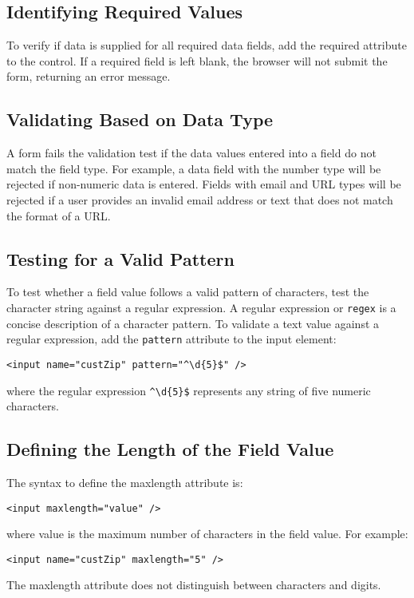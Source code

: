 \documentclass{article}
\begin{document}
\subsection{Identifying Required Values}
To verify if data is supplied for all required data fields, add the required attribute to the control. If a required field is left blank, the browser will not submit the form, returning an error message.

\subsection{Validating Based on Data Type}
A form fails the validation test if the data values entered into a field do not match the field type. For example, a data field with the number type will be rejected if non-numeric data is entered. Fields with email and URL types will be rejected if a user provides an invalid email address or text that does not match the format of a URL.

\subsection{Testing for a Valid Pattern}
To test whether a field value follows a valid pattern of characters, test the character string against a regular expression. A regular expression or \texttt{regex} is a concise description of a character pattern. To validate a text value against a regular expression, add the \texttt{pattern} attribute to the input element:
\begin{lstlisting}
<input name="custZip" pattern="^\d{5}$" />
\end{lstlisting}
where the regular expression \texttt{\textasciicircum \textbackslash d\{5\}\$} represents any string of five numeric characters.


\subsection{Defining the Length of the Field Value}
The syntax to define the maxlength attribute is:
\begin{lstlisting}
<input maxlength="value" />
\end{lstlisting}
where value is the maximum number of characters in the field value. For example:
\begin{lstlisting}
<input name="custZip" maxlength="5" />
\end{lstlisting}
The maxlength attribute does not distinguish between characters and digits.
\end{document}
